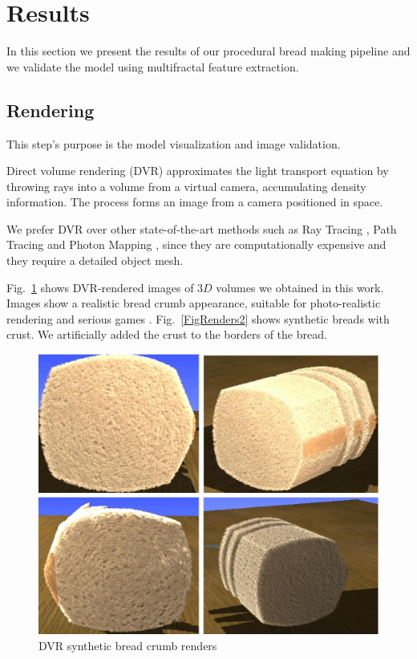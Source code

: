 \documentclass[final,5p,times]{elsarticle}
\begin{document}
{%
\section{Results}
In this section we present the results of our procedural bread making pipeline and we validate the model using multifractal feature extraction.

\subsection{Rendering}
This step's purpose is the model visualization and image validation.

Direct volume rendering (DVR) \cite{Kruger2003,Levoy1988, Max1995} approximates the light transport equation by throwing rays into a volume from a virtual camera, accumulating density information. The process forms an image from a camera positioned in space.

We prefer DVR over other state-of-the-art methods such as Ray Tracing \cite{Whitted1980,Singh2010}, Path Tracing \cite{Lafortune1993} and Photon Mapping \cite{Jensen1996}, since they are computationally expensive and they require a detailed object mesh.

Fig.~\ref{FigRenders} shows DVR-rendered images  of $3D$ volumes we obtained in this work. Images show a realistic bread crumb appearance, suitable for photo-realistic rendering and serious games \cite{Susi2007}. Fig.~\ref{FigRenders2} shows synthetic breads with crust. We artificially added the crust to the borders of the bread.

\begin{figure}[!ht]
\includegraphics[scale=0.25]{render3.eps}
\caption{DVR synthetic bread crumb renders}
\label{FigRenders}
\end{figure}

}
\end{document}
